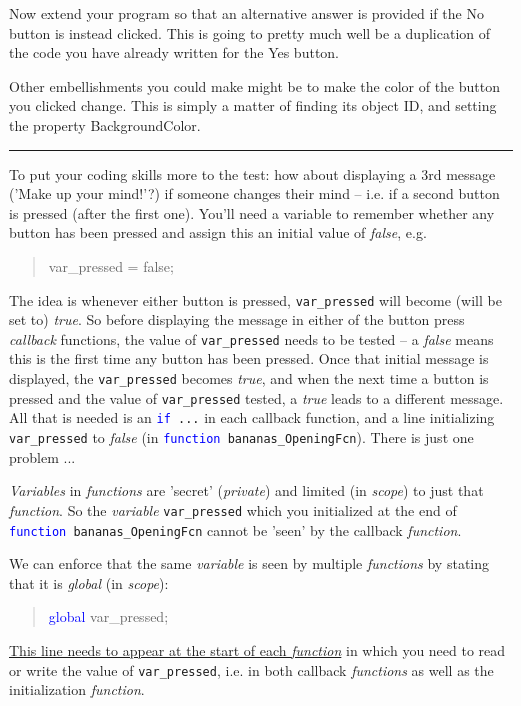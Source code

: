 \documentclass{tufte-book} %
\newenvironment{docspec}{\begin{quotation}\ttfamily\parskip0pt\parindent0pt\ignorespaces}{\end{quotation}}
\begin{document}
Now extend your program so that an alternative answer is provided if the \textsf{No} button is instead clicked. This is going to pretty much well be a duplication of the code you have already written for the \textsf{Yes} button.

Other embellishments you could make might be to make the color of the button you clicked change. This is simply a matter of finding its object ID, and setting the property \textsf{BackgroundColor}.

\vspace{1mm}
\noindent\rule{4cm}{0.5pt}
\vspace{2mm}

\noindent To put your coding skills more to the test: how about displaying a 3rd message ('Make up your mind!'?) if someone changes their mind -- i.e. if a second button is pressed (after the first one). You'll need a variable to remember whether any button has been pressed and assign this an initial value of \textit{false}, e.g.
\begin{docspec}
var\_pressed = false;
\end{docspec}
The idea is whenever either button is pressed, \texttt{var\_pressed} will become (will be set to) \textit{true}. So before displaying the message in either of the button press \textit{callback} functions, the value of \texttt{var\_pressed} needs to be tested -- a \textit{false} means this is the first time any button has been pressed. Once that initial message is displayed, the \texttt{var\_pressed} becomes \textit{true}, and when the next time a button is pressed and the value of \texttt{var\_pressed} tested, a \textit{true} leads to a different message. All that is needed is an \texttt{\textcolor{blue}{if} ...} in each callback function, and a line initializing \texttt{var\_pressed} to \textit{false} (in \texttt{\textcolor{blue}{function} bananas\_OpeningFcn}). There is just one problem ...

\textit{Variables} in \textit{functions} are 'secret' (\textit{private}) and limited (in \textit{scope}) to just that \textit{function}. So the \textit{variable} \texttt{var\_pressed} which you initialized at the end of \texttt{\textcolor{blue}{function} bananas\_OpeningFcn} cannot be 'seen' by the callback \textit{function}.

We can enforce that the same \textit{variable} is seen by multiple \textit{functions} by stating that it is \textit{global} (in \textit{scope}):
\begin{docspec}
\textcolor{blue}{global} var\_pressed;
\end{docspec}
\uline{This line needs to appear at the start of each \textit{function}} in which you need to read or write the value of \texttt{var\_pressed}, i.e. in both callback \textit{functions} as well as the initialization \textit{function}.
\end{document}
